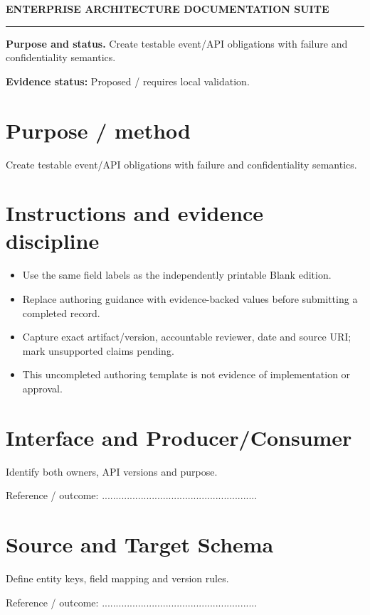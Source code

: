 \documentclass[10pt,letterpaper]{article}
\begin{document}
\begin{center}
{\large\bfseries\color{teal} ENTERPRISE ARCHITECTURE DOCUMENTATION SUITE}\par
{}\par
{}\par
\end{center}
\vspace{8pt}\hrule\vspace{12pt}
\textbf{Purpose and status.} Create testable event/API obligations with failure and confidentiality semantics.\par
\textbf{Evidence status:} Proposed / requires local validation.\par
\section{Purpose / method}
Create testable event/API obligations with failure and confidentiality semantics.\par
\section{Instructions and evidence discipline}
\begin{itemize}
\item Use the same field labels as the independently printable Blank edition.
\item Replace authoring guidance with evidence-backed values before submitting a completed record.
\item Capture exact artifact/version, accountable reviewer, date and source URI; mark unsupported claims pending.
\item This uncompleted authoring template is not evidence of implementation or approval.
\end{itemize}
\section{Interface and Producer/Consumer}
Identify both owners, API versions and purpose.\par
Reference / outcome: ........................................................\par
\section{Source and Target Schema}
Define entity keys, field mapping and version rules.\par
Reference / outcome: ........................................................\par
\end{document}
